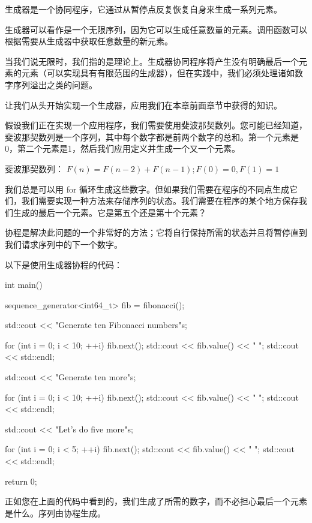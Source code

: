 

生成器是一个协同程序，它通过从暂停点反复恢复自身来生成一系列元素。

生成器可以看作是一个无限序列，因为它可以生成任意数量的元素。调用函数可以根据需要从生成器中获取任意数量的新元素。

当我们说无限时，我们指的是理论上。生成器协同程序将产生没有明确最后一个元素的元素（可以实现具有有限范围的生成器），但在实践中，我们必须处理诸如数字序列溢出之类的问题。

让我们从头开始实现一个生成器，应用我们在本章前面章节中获得的知识。


假设我们正在实现一个应用程序，我们需要使用斐波那契数列。您可能已经知道，斐波那契数列是一个序列，其中每个数字都是前两个数字的总和。第一个元素是 0，第二个元素是1，然后我们应用定义并生成一个又一个元素。

斐波那契数列： $F (n) = F (n − 2) + F (n − 1) ; F (0) = 0, F (1) = 1$

我们总是可以用 for 循环生成这些数字。但如果我们需要在程序的不同点生成它们，我们需要实现一种方法来存储序列的状态。我们需要在程序的某个地方保存我们生成的最后一个元素。它是第五个还是第十个元素？

协程是解决此问题的一个非常好的方法；它将自行保持所需的状态并且将暂停直到我们请求序列中的下一个数字。

以下是使用生成器协程的代码：

\begin{cpp}
int main() {
    sequence_generator<int64_t> fib = fibonacci();

    std::cout << "Generate ten Fibonacci numbers\n"s;

    for (int i = 0; i < 10; ++i) {
        fib.next();
        std::cout << fib.value() << " ";
    }
    std::cout << std::endl;

    std::cout << "Generate ten more\n"s;

    for (int i = 0; i < 10; ++i) {
        fib.next();
        std::cout << fib.value() << " ";
    }
    std::cout << std::endl;

    std::cout << "Let's do five more\n"s;

    for (int i = 0; i < 5; ++i) {
        fib.next();
        std::cout << fib.value() << " ";
    }
    std::cout << std::endl;

    return 0;
}
\end{cpp}

正如您在上面的代码中看到的，我们生成了所需的数字，而不必担心最后一个元素是什么。序列由协程生成。

